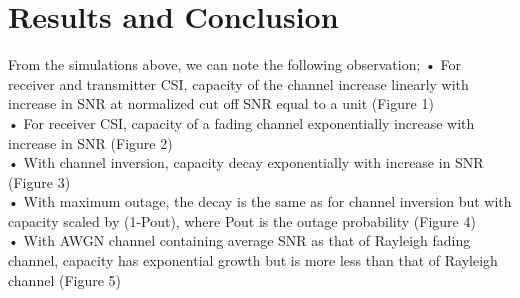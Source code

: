 \documentclass{article}
\begin{document}
\section{Results and Conclusion}
From the simulations above, we can note the following observation;
•	For receiver and transmitter CSI, capacity of the channel increase linearly with increase in SNR at normalized cut off SNR equal to a unit (Figure 1)\\
•	For receiver CSI, capacity of a fading channel exponentially increase with increase in SNR (Figure 2)\\
•	With channel inversion, capacity decay exponentially with increase in SNR (Figure 3)\\
•	With maximum outage, the decay is the same as for channel inversion but with capacity scaled by (1-Pout), where Pout is the outage probability (Figure 4)\\
•	With AWGN channel containing average SNR as that of Rayleigh fading channel, capacity has exponential growth but is more less than that of Rayleigh channel (Figure 5)\\
\end{document}
